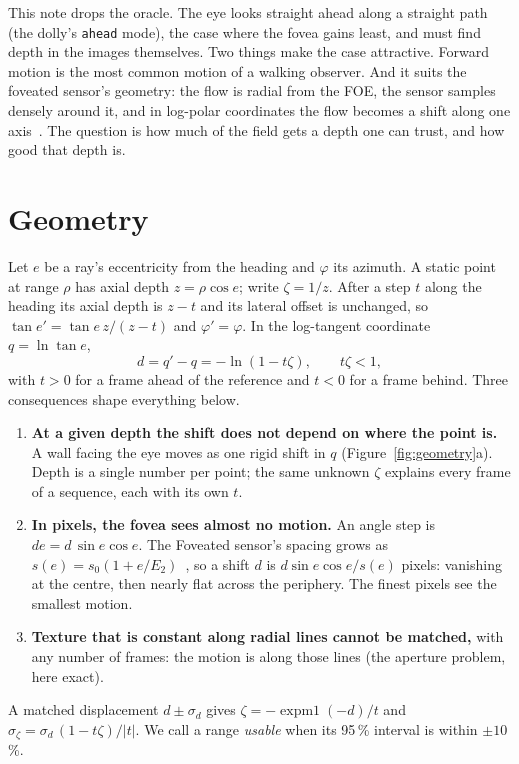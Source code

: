 \documentclass[11pt,a4paper]{article}
\newcommand{\code}[1]{\texttt{\small #1}}
\begin{document}
This note drops the oracle. The eye looks straight ahead along a straight path (the dolly's \code{ahead} mode), the case
where the fovea gains least, and must find depth in the images themselves. Two things make the case attractive. Forward
motion is the most common motion of a walking observer. And it suits the foveated sensor's geometry: the flow is radial
from the FOE, the sensor samples densely around it, and in log-polar coordinates the flow becomes a shift along one
axis~\cite{schwartz,tistarelli}. The question is how much of the field gets a depth one can trust, and how good that
depth is.

\section{Geometry}\label{sec:geometry}

Let $e$ be a ray's eccentricity from the heading and $\varphi$ its azimuth. A static point at range $\rho$ has axial depth
$z=\rho\cos e$; write $\zeta=1/z$. After a step $t$ along the heading its axial depth is $z-t$ and its lateral offset is
unchanged, so $\tan e' = \tan e\,z/(z-t)$ and $\varphi'=\varphi$. In the log-tangent coordinate $q=\ln\tan e$,
\begin{equation}\label{eq:d}
  d = q'-q = -\ln(1-t\zeta), \qquad t\zeta<1,
\end{equation}
with $t>0$ for a frame ahead of the reference and $t<0$ for a frame behind. Three consequences shape everything below.
\begin{enumerate}
\item \textbf{At a given depth the shift does not depend on where the point is.} A wall facing the eye moves as one
  rigid shift in $q$ (Figure~\ref{fig:geometry}a). Depth is a single number per point; the same unknown $\zeta$ explains
  every frame of a sequence, each with its own $t$.
\item \textbf{In pixels, the fovea sees almost no motion.} An angle step is $de = d\,\sin e\cos e$. The Foveated
  sensor's spacing grows as $s(e)=s_0(1+e/E_2)$~\cite{fovrendertr}, so a shift $d$ is $d\sin e\cos e/s(e)$ pixels:
  vanishing at the centre, then nearly flat across the periphery. The finest pixels see the smallest motion.
\item \textbf{Texture that is constant along radial lines cannot be matched,} with any number of frames: the motion is
  along those lines (the aperture problem, here exact).
\end{enumerate}
A matched displacement $d\pm\sigma_d$ gives $\zeta=-\operatorname{expm1}(-d)/t$ and $\sigma_\zeta=\sigma_d\,(1-t\zeta)/|t|$.
We call a range \emph{usable} when its 95\,\% interval is within $\pm10$\,\%.
\end{document}
